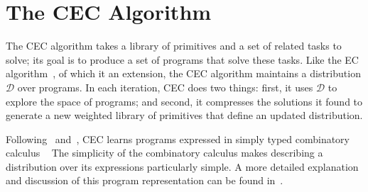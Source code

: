 \documentclass{article} %
\begin{document}



\section{The CEC Algorithm}

The CEC algorithm takes a library of primitives and a set of related tasks to solve; its goal is to produce a set of programs that solve these tasks. Like the EC algorithm~\cite{DBLP:conf/ijcai/DechterMAT13}, of which it an extension, the CEC algorithm maintains a distribution $\mathcal{D}$ over programs.
In each iteration, CEC does two things: first, it uses $\mathcal{D}$ to explore the space of programs;
 and second, it compresses the solutions it found to generate a new weighted library of primitives that define an updated distribution.

Following~\cite{DBLP:conf/ijcai/DechterMAT13} and~\cite{DBLP:conf/icml/LiangJK10}, CEC learns programs expressed in
simply typed combinatory calculus 
~\citep{DBLP:books/daglib/0005958} %
 The simplicity of the combinatory calculus makes describing a distribution over its expressions particularly simple. A more detailed explanation and discussion of this program representation can be found in~\cite{DBLP:conf/ijcai/DechterMAT13,DBLP:conf/icml/LiangJK10}. 
\end{document}
